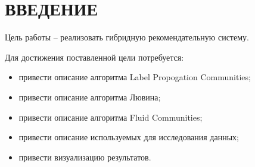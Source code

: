 \section*{ВВЕДЕНИЕ}

Цель работы -- реализовать гибридную рекомендательную систему.

Для достижения поставленной цели потребуется:
\begin{itemize}
	\item привести описание алгоритма Label Propogation Communities;
	\item привести описание алгоритма Лювина;
	\item привести описание алгоритма Fluid Communities;
	\item привести описание используемых для исследования данных;
	\item привести визуализацию результатов.
\end{itemize}

\pagebreak